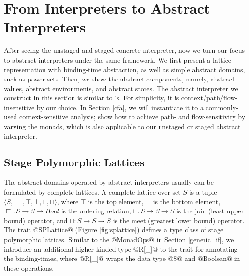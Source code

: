 \section{From Interpreters to Abstract Interpreters} \label{unstaged_abs}

After seeing the unstaged and staged concrete interpreter, now we turn our
focus to abstract interpreters under the same framework. We first present a
lattice representation with binding-time abstraction, as well as simple
abstract domains, such as power sets.  Then, we show the abstract
components, namely, abstract values, abstract environments, and abstract stores.
The abstract interpreter we construct in this section is similar to
\citet{DBLP:journals/pacmpl/DaraisLNH17}'s. For simplicity, it is
context/path/flow-insensitive by our choice. In Section \ref{cfa}, we will
instantiate it to a commonly-used context-sensitive analysis;
\citet{Darais:2015:GTM:2814270.2814308} show how to achieve path- and
flow-sensitivity by varying the monads, which is also applicable to our
unstaged or staged abstract interpreter.

\subsection{Stage Polymorphic Lattices} \label{stagedpoly_lat}

The abstract domains operated by abstract interpreters usually can be
formulated by complete lattices.
A complete lattice over set $S$ is a tuple $\langle S, \sqsubseteq, \top,
\bot, \sqcup, \sqcap \rangle$, where $\top$ is the top element, $\bot$ is the
bottom element, $\sqsubseteq : S \to S \to Bool$ is the
ordering relation, $\sqcup: S \to S \to S$ is the join (least upper bound)
operator, and $\sqcap: S \to S \to S$ is the meet (greatest lower bound)
operator. The trait @SPLattice@ (Figure \ref{fig:splattice}) defines a type
class of stage polymorphic lattices. Similar to the @MonadOps@ in Section
\ref{generic_if}, we introduce an additional higher-kinded type @R[_]@ to the
trait for annotating the binding-times, where @R[_]@ wraps the data type
@S@ and @Boolean@ in these operations.


